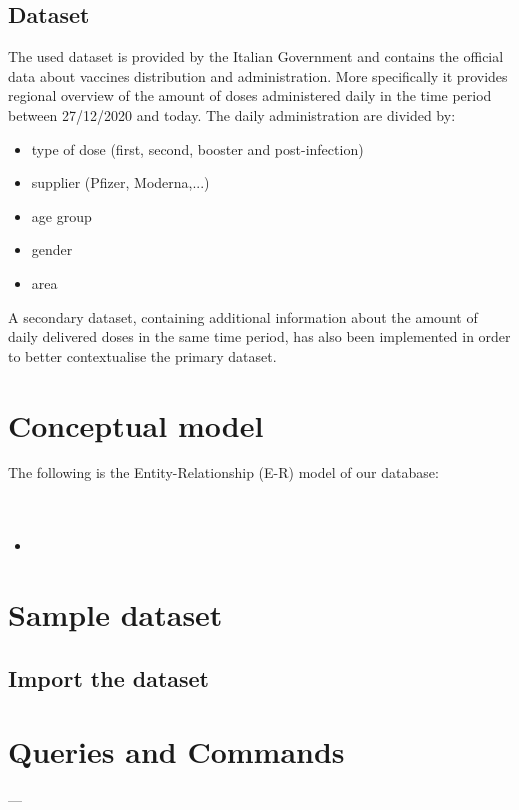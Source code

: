 \documentclass{article}
\begin{document}
\subsection{Dataset}
The used dataset is provided by the Italian Government and contains the official data about vaccines distribution and administration. More specifically it provides regional overview of the amount of doses administered daily in the time period between 27/12/2020 and today.
The daily administration are divided by:
\begin{itemize}
    \item type of dose (first, second, booster and post-infection)
    \item supplier (Pfizer, Moderna,...)
    \item age group
    \item gender
    \item area
\end{itemize}
A secondary dataset, containing additional information about the amount of daily delivered doses in the same time period, has also been implemented in order to better contextualise the primary dataset. 

\newpage

\section{Conceptual model}
The following is the Entity-Relationship (E-R) model of our database:\\ \\ \\
\vspace{1cm}
\begin{itemize}
    \item 
\end{itemize}
\newpage

\section{Sample dataset}

\subsection{Import the dataset}\label{import}

\newpage
\section{Queries and Commands}
---
\end{document}
